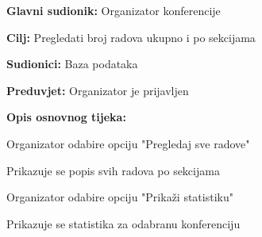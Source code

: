	\noindent {}
	\begin{packed_item}
		
		\item \textbf{Glavni sudionik: }Organizator konferencije
		\item  \textbf{Cilj:} Pregledati broj radova ukupno i po sekcijama
		\item  \textbf{Sudionici:} Baza podataka
		\item  \textbf{Preduvjet:} Organizator je prijavljen
		\item  \textbf{Opis osnovnog tijeka:}
		
		\item[] \begin{packed_enum}
			
			\item Organizator odabire opciju "Pregledaj sve radove"
			\item Prikazuje se popis svih radova po sekcijama
			\item Organizator odabire opciju "Prikaži statistiku"
			\item Prikazuje se statistika za odabranu konferenciju
			
		\end{packed_enum}
	\end{packed_item}

